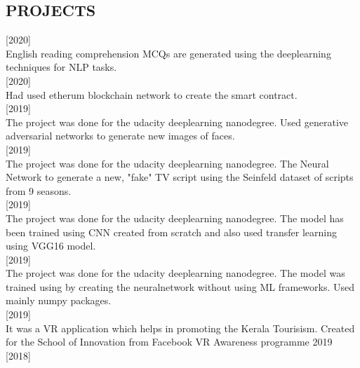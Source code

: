 \documentclass[margin]{res}
\begin{document}
\begin{resume}
\section{PROJECTS} 

    \sl

    \normalfont {} \hfill [2020] \\ 
     English reading comprehension MCQs are generated using the deeplearning techniques for NLP tasks.
\\
    \normalfont {} \hfill [2020] \\ 
     Had used etherum blockchain network to create the smart contract.
\\
    \normalfont {} \hfill [2019] \\ 
     The project was done for the udacity deeplearning nanodegree. Used generative adversarial networks to generate new images of faces.
\\
    \normalfont {} \hfill [2019] \\ 
     The project was done for the udacity deeplearning nanodegree. The Neural Network to generate a new, "fake" TV script using the Seinfeld dataset of scripts from 9 seasons.
\\
    \normalfont {} \hfill [2019] \\ 
     The project was done for the udacity deeplearning nanodegree. The model has been trained using CNN created from scratch and also used transfer learning using VGG16 model. 
\\
    \normalfont {} \hfill [2019] \\ 
     The project was done for the udacity deeplearning nanodegree. The model was trained using by creating the neuralnetwork without using ML frameworks. Used mainly numpy packages.
     \\   
    \normalfont {} \hfill [2019]\\ 
     It was a VR application which helps in promoting the Kerala Tourisism. Created for the  School of Innovation from Facebook VR Awareness programme 2019 
     \\     \normalfont {} \hfill [2018] \\ 

\end{resume}
\end{document}
